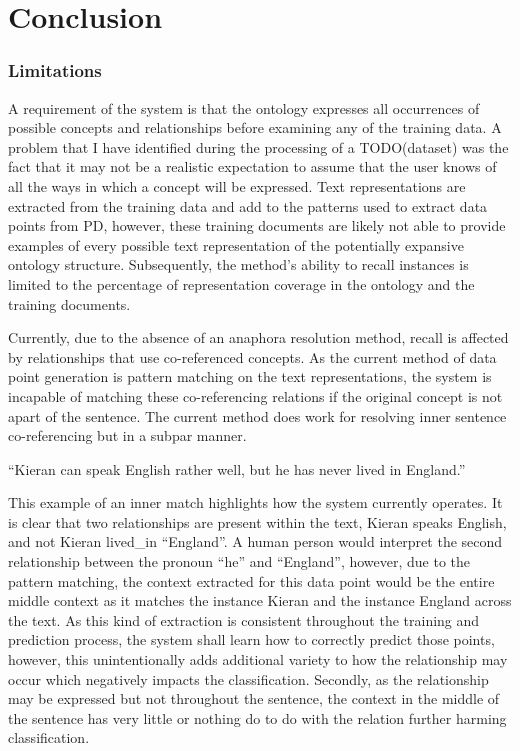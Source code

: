 \documentclass[11pt]{article} %
\begin{document}
\section{Conclusion}

\subsubsection{Limitations}

A requirement of the system is that the ontology expresses all occurrences of possible concepts and relationships before examining any of the training data. A problem that I have identified during the processing of a TODO(dataset) was the fact that it may not be a realistic expectation to assume that the user knows of all the ways in which a concept will be expressed. Text representations are extracted from the training data and add to the patterns used to extract data points from PD, however, these training documents are likely not able to provide examples of every possible text representation of the potentially expansive ontology structure. Subsequently, the method’s ability to recall instances is limited to the percentage of representation coverage in the ontology and the training documents.

Currently, due to the absence of an anaphora resolution method, recall is affected by relationships that use co-referenced concepts. As the current method of data point generation is pattern matching on the text representations, the system is incapable of matching these co-referencing relations if the original concept is not apart of the sentence. The current method does work for resolving inner sentence co-referencing but in a subpar manner.

“Kieran can speak English rather well, but he has never lived in England.”

This example of an inner match highlights how the system currently operates. It is clear that two relationships are present within the text, Kieran speaks English, and not Kieran lived\_in “England”. A human person would interpret the second relationship between the pronoun “he” and “England”, however, due to the pattern matching, the context extracted for this data point would be the entire middle context as it matches the instance Kieran and the instance England across the text. As this kind of extraction is consistent throughout the training and prediction process, the system shall learn how to correctly predict those points, however, this unintentionally adds additional variety to how the relationship may occur which negatively impacts the classification. Secondly, as the relationship may be expressed but not throughout the sentence, the context in the middle of the sentence has very little or nothing do to do with the relation further harming classification.
\end{document}
